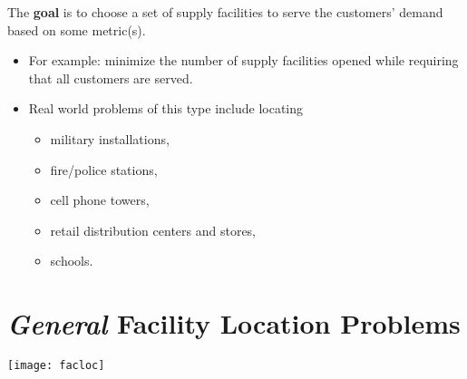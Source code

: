 \documentclass[11pt]{article}
\renewcommand{\labelitemi}{$\bullet$}
\theoremstyle{definition}
\begin{document}
The \textbf{goal} is to choose a set of supply facilities to serve the customers' demand based on some metric(s).
\begin{itemize}
\item For example: minimize the number of supply facilities opened while requiring that all customers are served.  
\item  Real world problems of this type include locating 
\begin{itemize}
\item military installations, 
\item fire/police stations, 
\item cell phone towers, 
\item retail distribution centers and stores, 
\item schools.
\end{itemize}
\end{itemize}


\newpage
\section{\emph{General} Facility Location Problems}
\begin{center}
\texttt{[image: facloc]}
\end{center}
\end{document}
